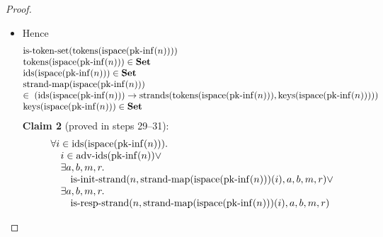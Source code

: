 \documentclass[11pt]{article}
\theoremstyle{plain}
\begin{document}
\begin{proof}
\begin{itemize}[leftmargin=2.8em, itemsep=4pt, parsep=1pt]
  \item[\textbf{24--28}] Hence 
\begin{equation*}
\begin{array}{@{}l@{}}
\operatorname{is\text{-}token\text{-}set}(\operatorname{tokens}(\operatorname{ispace}(\operatorname{pk\text{-}inf}(n)))) \\
\operatorname{tokens}(\operatorname{ispace}(\operatorname{pk\text{-}inf}(n))) \in \mathbf{Set} \\
\operatorname{ids}(\operatorname{ispace}(\operatorname{pk\text{-}inf}(n))) \in \mathbf{Set} \\
\begin{array}{@{}l@{}} \operatorname{strand\text{-}map}(\operatorname{ispace}(\operatorname{pk\text{-}inf}(n))) \\ \in\; (\operatorname{ids}(\operatorname{ispace}(\operatorname{pk\text{-}inf}(n))) \to \operatorname{strands}(\operatorname{tokens}(\operatorname{ispace}(\operatorname{pk\text{-}inf}(n))), \operatorname{keys}(\operatorname{ispace}(\operatorname{pk\text{-}inf}(n))))) \end{array} \\
\operatorname{keys}(\operatorname{ispace}(\operatorname{pk\text{-}inf}(n))) \in \mathbf{Set}
\end{array}
\end{equation*}
\textbf{Claim 2} (proved in steps 29--31):
\begin{equation*}
\begin{array}{@{}l@{}} \forall i \in \operatorname{ids}(\operatorname{ispace}(\operatorname{pk\text{-}inf}(n))). \\ \quad i \in \operatorname{adv\text{-}ids}(\operatorname{pk\text{-}inf}(n)) \vee \\ \quad \exists a, b, m, r. \\ \quad \quad \operatorname{is\text{-}init\text{-}strand}(n, \operatorname{strand\text{-}map}(\operatorname{ispace}(\operatorname{pk\text{-}inf}(n)))(i), a, b, m, r) \vee \\ \quad \exists a, b, m, r. \\ \quad \quad \operatorname{is\text{-}resp\text{-}strand}(n, \operatorname{strand\text{-}map}(\operatorname{ispace}(\operatorname{pk\text{-}inf}(n)))(i), a, b, m, r) \end{array}
\end{equation*}


\end{itemize}
\end{proof}
\end{document}
